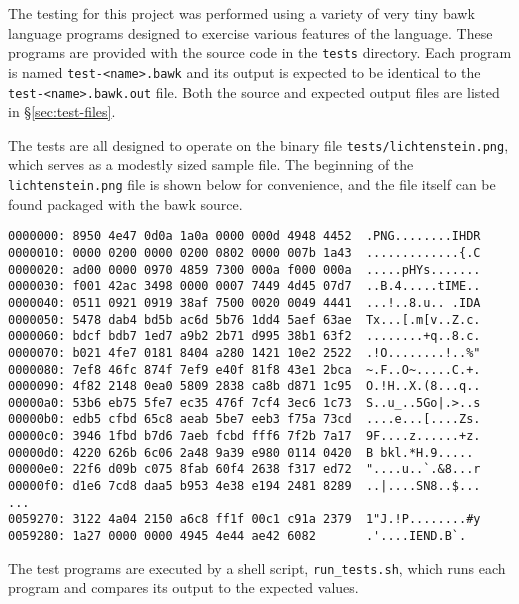 The testing for this project was performed using a variety of very tiny bawk language programs designed to exercise various features of the language.  These programs are provided with the source code in the \texttt{tests} directory.  Each program is named \texttt{test-<name>.bawk} and its output is expected to be identical to the \texttt{test-<name>.bawk.out} file.  Both the source and expected output files are listed in \S\ref{sec:test-files}.

The tests are all designed to operate on the binary file \texttt{tests/lichtenstein.png}, which serves as a modestly sized sample file.  The beginning of the \texttt{lichtenstein.png} file is shown below for convenience, and the file itself can be found packaged with the bawk source.
\begin{verbatim}
0000000: 8950 4e47 0d0a 1a0a 0000 000d 4948 4452  .PNG........IHDR
0000010: 0000 0200 0000 0200 0802 0000 007b 1a43  .............{.C
0000020: ad00 0000 0970 4859 7300 000a f000 000a  .....pHYs.......
0000030: f001 42ac 3498 0000 0007 7449 4d45 07d7  ..B.4.....tIME..
0000040: 0511 0921 0919 38af 7500 0020 0049 4441  ...!..8.u.. .IDA
0000050: 5478 dab4 bd5b ac6d 5b76 1dd4 5aef 63ae  Tx...[.m[v..Z.c.
0000060: bdcf bdb7 1ed7 a9b2 2b71 d995 38b1 63f2  ........+q..8.c.
0000070: b021 4fe7 0181 8404 a280 1421 10e2 2522  .!O........!..%"
0000080: 7ef8 46fc 874f 7ef9 e40f 81f8 43e1 2bca  ~.F..O~.....C.+.
0000090: 4f82 2148 0ea0 5809 2838 ca8b d871 1c95  O.!H..X.(8...q..
00000a0: 53b6 eb75 5fe7 ec35 476f 7cf4 3ec6 1c73  S..u_..5Go|.>..s
00000b0: edb5 cfbd 65c8 aeab 5be7 eeb3 f75a 73cd  ....e...[....Zs.
00000c0: 3946 1fbd b7d6 7aeb fcbd fff6 7f2b 7a17  9F....z......+z.
00000d0: 4220 626b 6c06 2a48 9a39 e980 0114 0420  B bkl.*H.9..... 
00000e0: 22f6 d09b c075 8fab 60f4 2638 f317 ed72  "....u..`.&8...r
00000f0: d1e6 7cd8 daa5 b953 4e38 e194 2481 8289  ..|....SN8..$...
...
0059270: 3122 4a04 2150 a6c8 ff1f 00c1 c91a 2379  1"J.!P........#y
0059280: 1a27 0000 0000 4945 4e44 ae42 6082       .'....IEND.B`.
\end{verbatim}

The test programs are executed by a shell script, \texttt{run\_tests.sh}, which runs each program and compares its output to the expected values.

